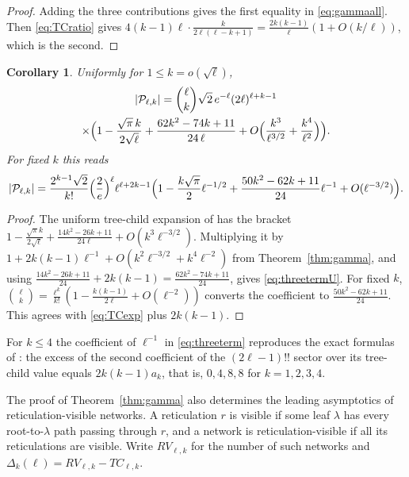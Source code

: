 \documentclass[11pt,a4paper]{article}
\newtheorem{corollary}[theorem]{Corollary}
\theoremstyle{definition}
\newcommand{\cP}{\mathcal{P}}
\begin{document}
\begin{proof}
Adding the three contributions gives the first equality in \eqref{eq:gammaall}. Then \eqref{eq:TCratio} gives $4(k-1)\ell\cdot\frac{k}{2\ell(\ell-k+1)}=\frac{2k(k-1)}{\ell}(1+O(k/\ell))$, which is the second.
\end{proof}

\begin{corollary}\label{cor:threeterm}
Uniformly for $1\le k=o(\sqrt\ell)$,
\begin{multline}\label{eq:threetermU}
|\cP_{\ell,k}|=\binom{\ell}{k}\sqrt2\,e^{-\ell}(2\ell)^{\ell+k-1}\\
\times\Bigl(1-\frac{\sqrt\pi\,k}{2\sqrt\ell}+\frac{62k^2-74k+11}{24\,\ell}+O\Bigl(\frac{k^3}{\ell^{3/2}}+\frac{k^4}{\ell^2}\Bigr)\Bigr).
\end{multline}
For fixed $k$ this reads
\begin{equation}\label{eq:threeterm}
|\cP_{\ell,k}|=\frac{2^{k-1}\sqrt2}{k!}\Bigl(\frac2e\Bigr)^{\ell}\ell^{\ell+2k-1}\Bigl(1-\frac{k\sqrt\pi}{2}\ell^{-1/2}+\frac{50k^2-62k+11}{24}\ell^{-1}+O(\ell^{-3/2})\Bigr).
\end{equation}
\end{corollary}

\begin{proof}
The uniform tree-child expansion of \cite[Prop.~4.1]{YZasym} has the bracket $1-\frac{\sqrt\pi k}{2\sqrt\ell}+\frac{14k^2-26k+11}{24\ell}+O(k^3\ell^{-3/2})$. Multiplying it by $1+2k(k-1)\ell^{-1}+O(k^2\ell^{-3/2}+k^4\ell^{-2})$ from Theorem~\ref{thm:gamma}, and using $\frac{14k^2-26k+11}{24}+2k(k-1)=\frac{62k^2-74k+11}{24}$, gives \eqref{eq:threetermU}. For fixed $k$, $\binom{\ell}{k}=\frac{\ell^k}{k!}(1-\frac{k(k-1)}{2\ell}+O(\ell^{-2}))$ converts the coefficient to $\frac{50k^2-62k+11}{24}$. This agrees with \eqref{eq:TCexp} plus $2k(k-1)$.
\end{proof}

For $k\le4$ the coefficient of $\ell^{-1}$ in \eqref{eq:threeterm} reproduces the exact formulas of \cite{Zhang19,Mansouri22,Yu26,YuZhang26}: the excess of the second coefficient of the $(2\ell-1)!!$ sector over its tree-child value equals $2k(k-1)a_k$, that is, $0,4,8,8$ for $k=1,2,3,4$.

The proof of Theorem~\ref{thm:gamma} also determines the leading asymptotics of reticulation-visible networks. A reticulation $r$ is visible if some leaf $\lambda$ has every root-to-$\lambda$ path passing through $r$, and a network is reticulation-visible if all its reticulations are visible. Write $RV_{\ell,k}$ for the number of such networks and $\Delta_k(\ell)=RV_{\ell,k}-TC_{\ell,k}$.
\end{document}
